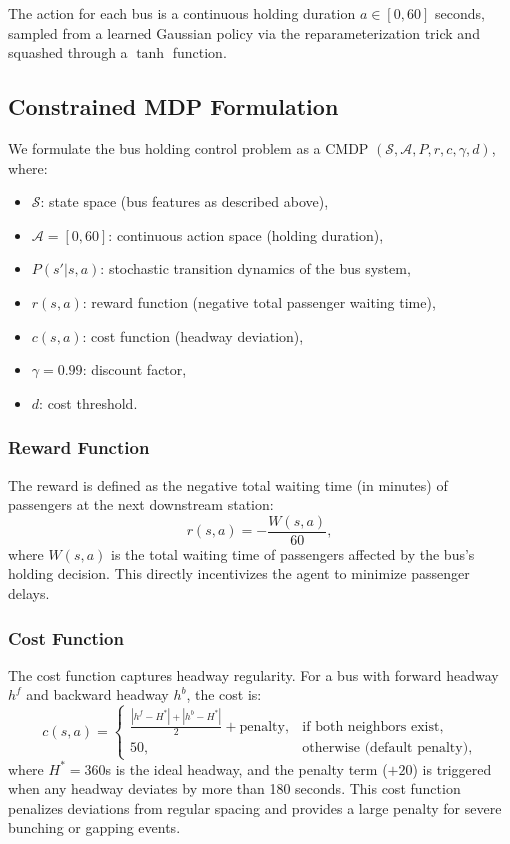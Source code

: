 \documentclass[10pt]{article}
\begin{document}
The action for each bus is a continuous holding duration $a \in [0, 60]$ seconds, sampled from a learned Gaussian policy via the reparameterization trick and squashed through a $\tanh$ function.

\subsection{Constrained MDP Formulation}

We formulate the bus holding control problem as a CMDP $(\mathcal{S}, \mathcal{A}, P, r, c, \gamma, d)$, where:
\begin{itemize}
    \item $\mathcal{S}$: state space (bus features as described above),
    \item $\mathcal{A} = [0, 60]$: continuous action space (holding duration),
    \item $P(s'|s,a)$: stochastic transition dynamics of the bus system,
    \item $r(s,a)$: reward function (negative total passenger waiting time),
    \item $c(s,a)$: cost function (headway deviation),
    \item $\gamma = 0.99$: discount factor,
    \item $d$: cost threshold.
\end{itemize}

\subsubsection{Reward Function}

The reward is defined as the negative total waiting time (in minutes) of passengers at the next downstream station:
\begin{equation}
    r(s, a) = -\frac{W(s, a)}{60},
    \label{eq:reward}
\end{equation}
where $W(s, a)$ is the total waiting time of passengers affected by the bus's holding decision. This directly incentivizes the agent to minimize passenger delays.

\subsubsection{Cost Function}

The cost function captures headway regularity. For a bus with forward headway $h^f$ and backward headway $h^b$, the cost is:
\begin{equation}
    c(s, a) = \begin{cases}
        \frac{|h^f - H^*| + |h^b - H^*|}{2} + \text{penalty}, & \text{if both neighbors exist}, \\
        50, & \text{otherwise (default penalty)},
    \end{cases}
    \label{eq:cost}
\end{equation}
where $H^* = 360$s is the ideal headway, and the penalty term ($+20$) is triggered when any headway deviates by more than 180 seconds. This cost function penalizes deviations from regular spacing and provides a large penalty for severe bunching or gapping events.
\end{document}
